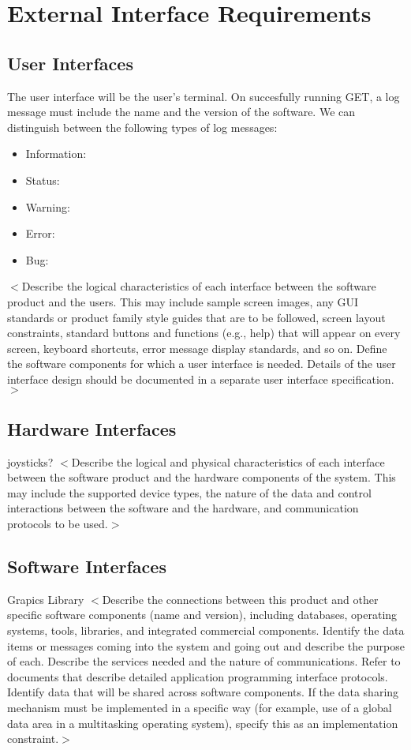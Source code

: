 \documentclass{scrreprt}
\begin{document}
\chapter{External Interface Requirements}

\section{User Interfaces}
The user interface will be the user's terminal. On succesfully running GET, a log message must include the name and the version of the software. We can distinguish between the following types of log messages:
\begin{itemize}
\item Information:
\item Status:
\item Warning:
\item Error:
\item Bug:
\end{itemize}
$<$Describe the logical characteristics of each interface between the software 
product and the users. This may include sample screen images, any GUI standards 
or product family style guides that are to be followed, screen layout 
constraints, standard buttons and functions (e.g., help) that will appear on 
every screen, keyboard shortcuts, error message display standards, and so on.  
Define the software components for which a user interface is needed. Details of 
the user interface design should be documented in a separate user interface 
specification.$>$

\section{Hardware Interfaces}
joysticks?
$<$Describe the logical and physical characteristics of each interface between 
the software product and the hardware components of the system. This may include 
the supported device types, the nature of the data and control interactions 
between the software and the hardware, and communication protocols to be 
used.$>$

\section{Software Interfaces}
Grapics Library
$<$Describe the connections between this product and other specific software 
components (name and version), including databases, operating systems, tools, 
libraries, and integrated commercial components. Identify the data items or 
messages coming into the system and going out and describe the purpose of each.  
Describe the services needed and the nature of communications. Refer to 
documents that describe detailed application programming interface protocols.  
Identify data that will be shared across software components. If the data 
sharing mechanism must be implemented in a specific way (for example, use of a 
global data area in a multitasking operating system), specify this as an 
implementation constraint.$>$
\end{document}
